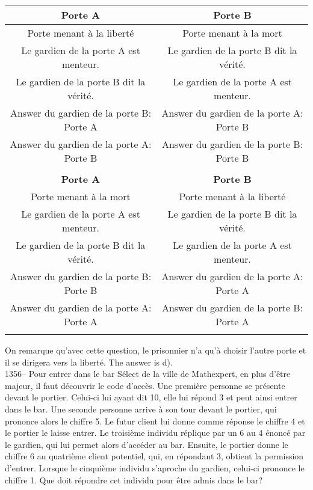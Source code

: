 \documentclass[letterpaper, 12pt]{article}
\begin{document}
\begin{tabular}{|c|c|} \hline
{\bf Porte A      }          & {\bf Porte B}  \\ \hline \hline

Porte menant \`a la libert\'e                  &  Porte menant \`a la mort
\\
\hline Le gardien de la porte A est menteur. & Le gardien de la porte B dit
la v\'erit\'e. \\
\hline
Le gardien de la porte B dit la v\'erit\'e. &  Le gardien de la porte A est
menteur. \\
\hline Answer du gardien de la porte B: Porte A & Answer du gardien de
la porte A: Porte B\\
\hline Answer du gardien de la porte A: Porte B & Answer du
gardien de la porte B: Porte B\\ \hline


\multicolumn{2}{c}{}\\
\hline
{\bf Porte A}                & {\bf Porte B}  \\ \hline \hline

Porte menant \`a la mort                 & Porte menant \`a la libert\'e \\
\hline
Le gardien de la porte A est menteur.      & Le gardien de la porte
B
dit la v\'erit\'e. \\
\hline  Le gardien de la porte B dit la v\'erit\'e. & Le gardien de
la porte A est menteur.
\\ \hline Answer du gardien de la porte B: Porte B & Answer du gardien
de la porte A: Porte
A\\ \hline Answer du gardien de la porte A: Porte A & Answer
du gardien de la porte B: Porte A \\ \hline
\multicolumn{2}{c}{}\\
\end{tabular}


On remarque qu'avec cette question, le prisonnier n'a qu'\`a choisir l'autre
porte et il se dirigera vers la libert\'e.  The answer is d).\\

1356--  Pour entrer dans le bar S\'elect de la ville de Mathexpert, en plus
d'\^etre majeur, il faut d\'ecouvrir le code d'acc\`es.  Une premi\`ere
personne se pr\'esente devant le portier.  Celui-ci lui ayant dit 10, elle
lui r\'epond 3 et peut ainsi entrer dans le bar.  Une seconde personne
arrive \`a son tour devant le portier, qui prononce alors le chiffre 5. Le
futur client lui donne comme r\'eponse le chiffre 4 et le portier le laisse
entrer.  Le troisi\`eme individu r\'eplique par un 6 au 4 \'enonc\'e par le
gardien, qui lui permet alors d'acc\'eder au bar. Ensuite, le portier donne
le chiffre 6 au quatri\`eme client potentiel, qui, en r\'epondant 3, obtient
la permission d'entrer. Lorsque le cinqui\`eme individu s'aproche du
gardien, celui-ci prononce le chiffre 1.  Que doit r\'epondre cet individu
pour \^etre admis dans le bar?\\
\end{document}

